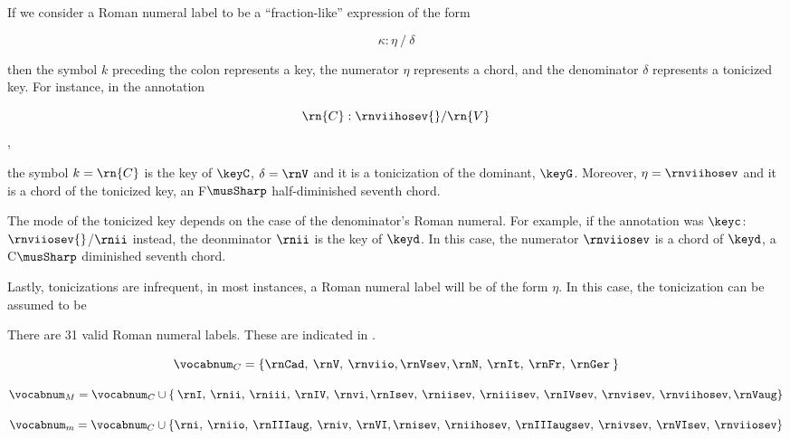 
If we consider a Roman numeral label to be a
``fraction-like'' expression of the form

\begin{equation}
    \kappa : \eta \: / \: \delta
\end{equation}

then the symbol $k$ preceding the colon represents a key,
the numerator $\eta$ represents a chord, and the denominator
$\delta$ represents a tonicized key. For instance, in the
annotation 

\begin{equation}
    \rn{C}:\rnviihosev{}/\rn{V}
\end{equation}, 

the symbol $k=\rn{C}$ is the key of $\keyC$, $\delta = \rnV$
and it is a tonicization of the dominant, $\keyG$. Moreover,
$\eta=\rnviihosev$ and it is a chord of the tonicized key,
an F$\musSharp$ half-diminished seventh chord.

The mode of the tonicized key depends on the case of the
denominator's Roman numeral. For example, if the annotation
was $\keyc$:$\rnviiosev{}$/$\rnii$ instead, the deonminator
$\rnii$ is the key of $\keyd$. In this case, the numerator
$\rnviiosev$ is a chord of $\keyd$, a C$\musSharp$
diminished seventh chord.

Lastly, tonicizations are infrequent, in most instances, a
Roman numeral label will be of the form $\eta$. In this
case, the tonicization can be assumed to be 

There are 31 valid Roman numeral labels. These are indicated
in .



\begin{equation}
    \vocabnum_{C} = \{ \rnCad, \: \rnV, \: \rnviio,
    \rnVsev, \rnN, \: \rnIt, \: \rnFr, \: \rnGer \: \}
\end{equation}

\begin{equation}
    \vocabnum_{M} = \vocabnum_{C} \cup \{ \: \rnI, \: \rnii, \: 
    \rniii, \: \rnIV, \: \rnvi, \rnIsev, \: \rniisev, \: 
    \rniiisev, \: \rnIVsev, \: \rnvisev, \: \rnviihosev, \rnVaug \}
\end{equation}

\begin{equation}
    \vocabnum_{m} = \vocabnum_{C} \cup  \{ \rni, \: \rniio, \: 
    \rnIIIaug, \: \rniv, \: \rnVI, \rnisev, \: \rniihosev, \: 
    \rnIIIaugsev, \: \rnivsev, \: \rnVIsev, \: \rnviiosev \}
\end{equation}

